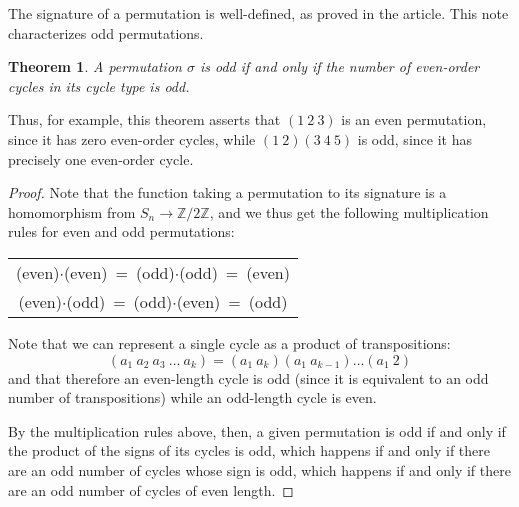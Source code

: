 \documentclass[12pt]{article}
\newtheorem{thm}{Theorem}
\newcommand{\Ints}{\mathbb{Z}}
\begin{document}
The signature of a permutation is well-defined, as proved in the  article. This note characterizes odd permutations.

\begin{thm} A permutation $\sigma$ is odd if and only if the number of even-order cycles in its cycle type is odd.
\end{thm}

Thus, for example, this theorem asserts that $(1~2~3)$ is an even permutation, since it has zero even-order cycles, while $(1~2)(3~4~5)$ is odd, since it has precisely one even-order cycle.

\begin{proof}
Note that the function taking a permutation to its signature is a homomorphism from $S_n\to \Ints/2\Ints$, and we thus get the following multiplication rules for even and odd permutations:
\begin{center}
\begin{tabular}{c}
(even)$\cdot$(even)\ =\ (odd)$\cdot$(odd)\ =\ (even)\\
(even)$\cdot$(odd)\ =\ (odd)$\cdot$(even)\ =\ (odd)
\end{tabular}
\end{center}

Note that we can represent a single cycle as a product of transpositions:
\[(a_1~a_2~a_3~\ldots~a_k)=(a_1~a_k)(a_1~a_{k-1})\ldots(a_1~2)\]
and that therefore an even-length cycle is odd (since it is equivalent to an odd number of transpositions) while an odd-length cycle is even.

By the multiplication rules above, then, a given permutation is odd if and only if the product of the signs of its cycles is odd, which happens if and only if there are an odd number of cycles whose sign is odd, which happens if and only if there are an odd number of cycles of even length.
\end{proof}
\end{document}
